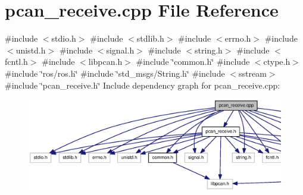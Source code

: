 \section{pcan\-\_\-receive.\-cpp \-File \-Reference}
\label{pcan__receive_8cpp}
{\ttfamily \#include $<$stdio.\-h$>$}\*
{\ttfamily \#include $<$stdlib.\-h$>$}\*
{\ttfamily \#include $<$errno.\-h$>$}\*
{\ttfamily \#include $<$unistd.\-h$>$}\*
{\ttfamily \#include $<$signal.\-h$>$}\*
{\ttfamily \#include $<$string.\-h$>$}\*
{\ttfamily \#include $<$fcntl.\-h$>$}\*
{\ttfamily \#include $<$libpcan.\-h$>$}\*
{\ttfamily \#include \char`\"{}common.\-h\char`\"{}}\*
{\ttfamily \#include $<$ctype.\-h$>$}\*
{\ttfamily \#include \char`\"{}ros/ros.\-h\char`\"{}}\*
{\ttfamily \#include \char`\"{}std\-\_\-msgs/\-String.\-h\char`\"{}}\*
{\ttfamily \#include $<$sstream$>$}\*
{\ttfamily \#include \char`\"{}pcan\-\_\-receive.\-h\char`\"{}}\*
\-Include dependency graph for pcan\-\_\-receive.\-cpp\-:\nopagebreak
\begin{figure}[H]
\begin{center}
\leavevmode
\includegraphics[width=350pt]{pcan__receive_8cpp__incl}
\end{center}
\end{figure}
